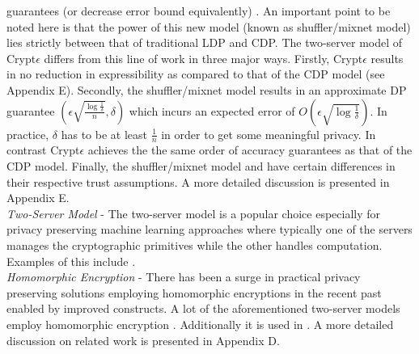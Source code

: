 guarantees (or decrease error bound equivalently) \cite{mixnets,Prochlo,amplification}.  An important point to be noted here is that the power of this new model (known as shuffler/mixnet model) lies strictly between that of traditional \textsf{LDP} and \textsf{CDP}. The two-server model of Crypt$\epsilon$ differs from this line of work in three major ways. Firstly, Crypt$\epsilon$ results in no reduction in expressibility as compared to that of the \textsf{CDP} model (see Appendix E). Secondly, the shuffler/mixnet model results in an approximate DP guarantee $(\epsilon\sqrt{\frac{\log\frac{1}{\delta}}{n}},\delta)$ which incurs an expected error of $O(\epsilon\sqrt{\log\frac{1}{\delta}})$.  In practice, $\delta$ has to be at least $\frac{1}{n}$ in order to get some meaningful privacy. In contrast Crypt$\epsilon$ achieves the the same order of accuracy guarantees as that of the \textsf{CDP} model. Finally, the shuffler/mixnet model and \system have certain differences in their respective trust assumptions. A more detailed discussion is presented in Appendix E. %
\\\textit{Two-Server Model} - The two-server model is a popular choice especially for privacy preserving machine learning approaches where typically one of the servers manages the cryptographic primitives while the other handles computation. Examples of this include \cite{Boneh1,Boneh2,Ridge2,Matrix2,secureML,LReg,Ver}. \\\textit{Homomorphic Encryption } - There has been a surge in practical privacy preserving solutions employing homomorphic encryptions in the recent past enabled by improved constructs. A lot of the aforementioned two-server models employ homomorphic encryption \cite{Boneh1,Boneh2,LReg,Matrix2}.  Additionally it is used in \cite{CryptoDL,CryptoNet,NN, Irene2, grid}.
A more detailed discussion on related work is presented in Appendix D.


